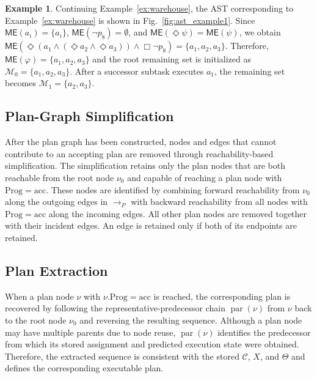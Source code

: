 \documentclass[lettersize,journal]{IEEEtran}
\theoremstyle{italiclemma}
\newtheorem{lemma}{Lemma}
\theoremstyle{italiclemma}
\theoremstyle{definition}
\newtheorem{example}{Example}
\begin{document}
\begin{example}\label{ex:me}
Continuing Example~\ref{ex:warehouse}, the AST corresponding to Example~\ref{ex:warehouse} is shown in Fig.~\ref{fig:ast_example1}. Since
$\mathsf{ME}(a_i)=\{a_i\}$,
$\mathsf{ME}(\neg p_8)=\emptyset$, and
$\mathsf{ME}(\Diamond\psi)=\mathsf{ME}(\psi)$, we obtain
$\mathsf{ME}(\Diamond(a_1\wedge
(\Diamond a_2\wedge\Diamond a_3))\wedge\Box\neg p_8)
=\{a_1,a_2,a_3\}$. Therefore,
$\mathsf{ME}(\varphi)=\{a_1,a_2,a_3\}$ and the root remaining set is initialized as $\mathcal M_0=\{a_1,a_2,a_3\}$. After a successor subtask executes $a_1$, the remaining set becomes $\mathcal M_1=\{a_2,a_3\}$.
\end{example}



\subsection{Plan-Graph Simplification}
\label{subsec:final_pruning}

After the plan graph has been constructed, nodes and edges that cannot contribute to an accepting plan are removed through reachability-based simplification.
The simplification retains only the plan nodes that are both reachable from the root node \(\nu_0\) and capable of reaching a plan node with \(\mathrm{Prog}=\mathrm{acc}\). These nodes are identified by combining forward reachability from \(\nu_0\) along the outgoing edges in \(\rightarrow_P\) with backward reachability from all nodes with \(\mathrm{Prog}=\mathrm{acc}\) along the incoming edges. All other plan nodes are removed together with their incident edges. An edge is retained only if both of its endpoints are retained.

\subsection{Plan Extraction}
\label{subsubsec:plan_extraction}
When a plan node $\nu$ with $\nu.\mathrm{Prog}=\mathrm{acc}$ is reached, the corresponding plan is recovered by following the representative-predecessor chain $\operatorname{par}(\nu)$ from $\nu$ back to the root node $\nu_0$ and reversing the resulting sequence. Although a plan node may have multiple parents due to node
reuse, $\operatorname{par}(\nu)$ identifies the predecessor from which its stored assignment and predicted execution state were obtained. Therefore, the extracted sequence is consistent with the stored $\mathcal C$, $X$, and $\Theta$ and defines the corresponding executable plan.
\end{document}

